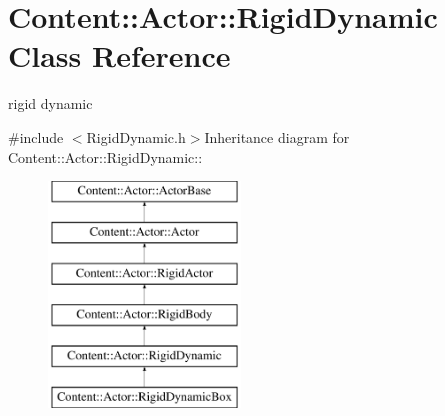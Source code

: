 \hypertarget{classContent_1_1Actor_1_1RigidDynamic}{
\section{Content::Actor::RigidDynamic Class Reference}
\label{classContent_1_1Actor_1_1RigidDynamic}
}


rigid dynamic  


{\ttfamily \#include $<$RigidDynamic.h$>$}Inheritance diagram for Content::Actor::RigidDynamic::\begin{figure}[H]
\begin{center}
\leavevmode
\includegraphics[height=6cm]{classContent_1_1Actor_1_1RigidDynamic}
\end{center}
\end{figure}

